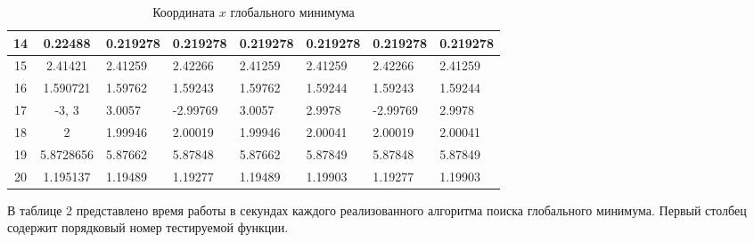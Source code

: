 \documentclass{report}
\begin{document}
\begin{table}[!h]
\begin{center}
\begin{tabular}{ | c | c | p{1.5cm} | p{1.5cm} | p{1.5cm} | p{1.5cm} | p{1.5cm} | p{1.5cm} | }
14 & 0.22488                     & 0.219278 &  0.219278 & 0.219278 & 0.219278 & 0.219278 & 0.219278 \\ \hline
15 & 2.41421                     & 2.41259 &  2.42266 & 2.41259 & 2.41259 & 2.42266 & 2.41259 \\ \hline
16 & 1.590721                    & 1.59762 &  1.59243 & 1.59762 & 1.59244 & 1.59243 & 1.59244 \\ \hline
17 & -3, 3                       & 3.0057 &  -2.99769 & 3.0057 & 2.9978 & -2.99769 & 2.9978 \\ \hline
18 & 2                           & 1.99946 &  2.00019 & 1.99946 & 2.00041 & 2.00019 & 2.00041 \\ \hline
19 & 5.8728656                   & 5.87662 &  5.87848 & 5.87662 & 5.87849 & 5.87848 & 5.87849 \\ \hline
20 & 1.195137                    & 1.19489 &  1.19277 & 1.19489 & 1.19903 & 1.19277 & 1.19903 \\ \hline
\end{tabular}
\end{center}
\caption{Координата $x$ глобального минимума}
\end{table}

В таблице 2 представлено время работы в секундах каждого реализованного алгоритма поиска глобального минимума. Первый столбец содержит порядковый номер тестируемой функции.

$ $
\end{document}
